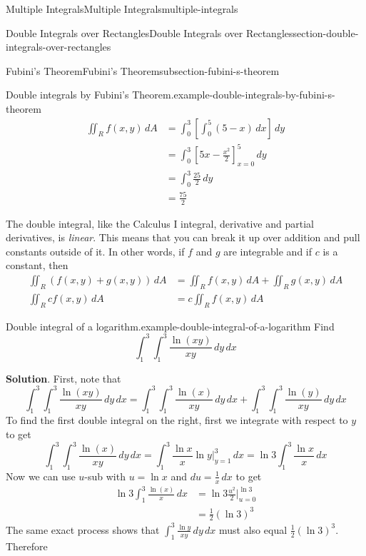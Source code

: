 \documentclass[oneside,10pt,]{book}
\numberwithin{equation}{section}
\begin{document}
\begin{chapterptx}{Multiple Integrals}{}{Multiple Integrals}{}{}{multiple-integrals}
\begin{sectionptx}{Double Integrals over Rectangles}{}{Double Integrals over Rectangles}{}{}{section-double-integrals-over-rectangles}
\begin{subsectionptx}{Fubini's Theorem}{}{Fubini's Theorem}{}{}{subsection-fubini-s-theorem}
\begin{example}{Double integrals by Fubini's Theorem.}{example-double-integrals-by-fubini-s-theorem}
\begin{align*}
\iint_{R}f(x,y)\,dA & = \int_{0}^{3}\left[\int_{0}^{5}(5-x)\,dx\right]\,dy \\
& = \int_{0}^{3}\left[5x - \frac{x^{2}}{2}\right]_{x=0}^{5}\,dy \\
& = \int_{0}^{3}\frac{25}{2}\,dy \\
& = \frac{75}{2} 
\end{align*}
%
\end{example}
\hypertarget{p-1471}{}%
The double integral, like the Calculus I integral, derivative and partial derivatives, is \emph{linear}. This means that you can break it up over addition and pull constants outside of it. In other words, if \(f\) and \(g\) are integrable and if \(c\) is a constant, then%
\begin{align*}
\iint_{R}(f(x,y) + g(x,y))\,dA & = \iint_{R}f(x,y)\,dA + \iint_{R}g(x,y)\,dA \\
\iint_{R}cf(x,y)\,dA & = c\iint_{R}f(x,y)\,dA 
\end{align*}
%
\begin{example}{Double integral of a logarithm.}{example-double-integral-of-a-logarithm}%
\hypertarget{p-1472}{}%
Find%
\begin{equation*}
\int_{1}^{3}\int_{1}^{3}\frac{\ln(xy)}{xy}\,dy\,dx
\end{equation*}
%
\par\smallskip%
\noindent\textbf{Solution}.\hypertarget{solution-240}{}\quad%
First, note that%
\begin{equation*}
\int_{1}^{3}\int_{1}^{3}\frac{\ln(xy)}{xy}\,dy\,dx = \int_{1}^{3}\int_{1}^{3}\frac{\ln(x)}{xy}\,dy\,dx + \int_{1}^{3}\int_{1}^{3}\frac{\ln(y)}{xy}\,dy\,dx
\end{equation*}
To find the first double integral on the right, first we integrate with respect to \(y\) to get%
\begin{equation*}
\int_{1}^{3}\int_{1}^{3}\frac{\ln(x)}{xy}\,dy\,dx = \int_{1}^{3}\frac{\ln x}{x}\ln y\big|_{y=1}^{3}\,dx = \ln 3\int_{1}^{3}\frac{\ln x}{x}\,dx
\end{equation*}
Now we can use \(u\)-sub with \(u = \ln x\) and \(du = \frac{1}{x}\,dx\) to get%
\begin{align*}
\ln3\int_{1}^{3}\frac{\ln(x)}{x}\,dx & = \ln3 \frac{u^{2}}{2}\big|_{u=0}^{\ln 3} \\
& = \frac{1}{2}(\ln3)^{3} 
\end{align*}
The same exact process shows that \(\int_{1}^{3}\frac{\ln y}{xy}\,dy\,dx\) must also equal \(\frac{1}{2}(\ln3)^{3}\). Therefore%

\end{example}
\end{subsectionptx}
\end{sectionptx}
\end{chapterptx}
\end{document}
